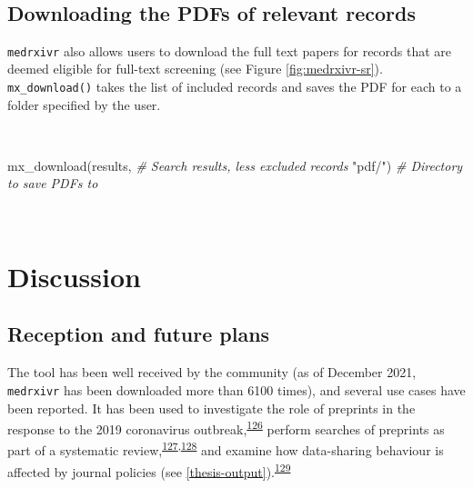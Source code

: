 \documentclass[a4paper, twoside]{templates/ociamthesis}
\newenvironment{Shaded}{\begin{snugshade}}{\end{snugshade}}
\newcommand{\CommentTok}[1]{\textcolor[rgb]{0.56,0.35,0.01}{\textit{#1}}}
\newcommand{\FunctionTok}[1]{\textcolor[rgb]{0.00,0.00,0.00}{#1}}
\newcommand{\NormalTok}[1]{#1}
\newcommand{\StringTok}[1]{\textcolor[rgb]{0.31,0.60,0.02}{#1}}
\renewenvironment{Shaded}
{
  \vspace{4pt}%
  \begin{snugshade}%
}{%
  \end{snugshade}%
  \vspace{4pt}%
}
\begin{document}
~

\hypertarget{downloading-the-pdfs-of-relevant-records}{%
\subsection{Downloading the PDFs of relevant records}\label{downloading-the-pdfs-of-relevant-records}}

\texttt{medrxivr} also allows users to download the full text papers for records that are deemed eligible for full-text screening (see Figure \ref{fig:medrxivr-sr}). \texttt{mx\_download()} takes the list of included records and saves the PDF for each to a folder specified by the user.

~

\begin{Shaded}
\begin{Highlighting}[]
\FunctionTok{mx\_download}\NormalTok{(results,  }\CommentTok{\# Search results, less excluded records}
            \StringTok{"pdf/"}\NormalTok{)   }\CommentTok{\# Directory to save PDFs to }
\end{Highlighting}
\end{Shaded}

~

\hypertarget{discussion}{%
\section{Discussion}\label{discussion}}

\hypertarget{reception-and-future-plans}{%
\subsection{Reception and future plans}\label{reception-and-future-plans}}

The tool has been well received by the community (as of December 2021, \texttt{medrxivr} has been downloaded more than 6100 times), and several use cases have been reported. It has been used to investigate the role of preprints in the response to the 2019 coronavirus outbreak,\textsuperscript{\protect\hyperlink{ref-kodvanj2020}{126}} perform searches of preprints as part of a systematic review,\textsuperscript{\protect\hyperlink{ref-noone2020}{127},\protect\hyperlink{ref-grassly2020}{128}} and examine how data-sharing behaviour is affected by journal policies (see \ref{thesis-output}).\textsuperscript{\protect\hyperlink{ref-mcguinness2020DAScomparison}{129}}
\end{document}
